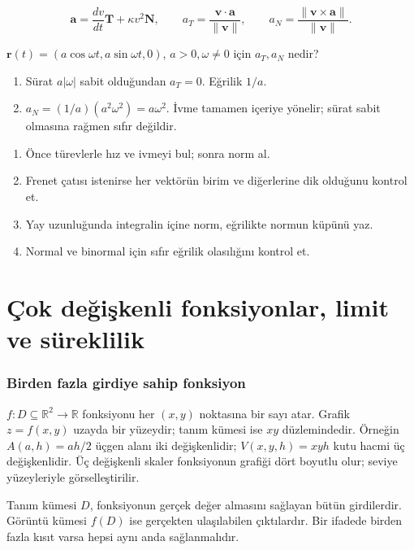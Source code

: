 {\small\[
\mathbf a=\frac{dv}{dt}\mathbf T+\kappa v^2\mathbf N,\qquad a_T=\frac{\mathbf v\cdot\mathbf a}{\|\mathbf v\|},\qquad a_N=\frac{\|\mathbf v\times\mathbf a\|}{\|\mathbf v\|}.
\]}
\begin{tcolorbox}[title={Örnek 3.23 | Dairesel harekette ivme},colframe=accent]\(\mathbf r(t)=(a\cos\omega t,a\sin\omega t,0)\), \(a>0,\omega\ne0\) için \(a_T,a_N\) nedir?
\par\vspace{1mm}{\scriptsize\sffamily Pekiştirme}\end{tcolorbox}
\begin{tcolorbox}[title={Adım adım çözüm},colback=green!3!white,colframe=green]\begin{enumerate}
\item Sürat \(a|\omega|\) sabit olduğundan \(a_T=0\). Eğrilik \(1/a\).
\item \(a_N=(1/a)(a^2\omega^2)=a\omega^2\). İvme tamamen içeriye yönelir; sürat sabit olmasına rağmen sıfır değildir.
\end{enumerate}\end{tcolorbox}
\begin{enumerate}
\item Önce türevlerle hız ve ivmeyi bul; sonra norm al.
\item Frenet çatısı istenirse her vektörün birim ve diğerlerine dik olduğunu kontrol et.
\item Yay uzunluğunda integralin içine norm, eğrilikte normun küpünü yaz.
\item Normal ve binormal için sıfır eğrilik olasılığını kontrol et.
\end{enumerate}
\clearpage\part{Çok değişkenli fonksiyonlar, limit ve süreklilik}
\section{Birden fazla girdiye sahip fonksiyon}
\(f:D\subseteq\mathbb R^2\to\mathbb R\) fonksiyonu her \((x,y)\) noktasına bir sayı atar. Grafik \(z=f(x,y)\) uzayda bir yüzeydir; tanım kümesi ise \(xy\) düzlemindedir. Örneğin \(A(a,h)=ah/2\) üçgen alanı iki değişkenlidir; \(V(x,y,h)=xyh\) kutu hacmi üç değişkenlidir. Üç değişkenli skaler fonksiyonun grafiği dört boyutlu olur; seviye yüzeyleriyle görselleştirilir.

Tanım kümesi \(D\), fonksiyonun gerçek değer almasını sağlayan bütün girdilerdir. Görüntü kümesi \(f(D)\) ise gerçekten ulaşılabilen çıktılardır. Bir ifadede birden fazla kısıt varsa hepsi aynı anda sağlanmalıdır.

